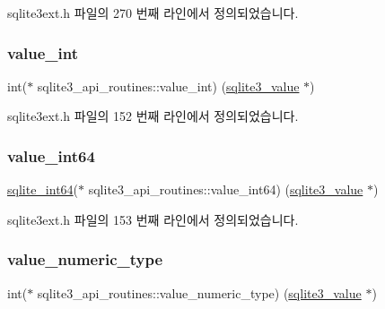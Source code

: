 sqlite3ext.\+h 파일의 270 번째 라인에서 정의되었습니다.

\mbox{\label{structsqlite3__api__routines_aaea71f352f2637f7d43781cd279ece62}} 
\subsubsection{\texorpdfstring{value\+\_\+int}{value\_int}}
{\footnotesize\ttfamily int($\ast$ sqlite3\+\_\+api\+\_\+routines\+::value\+\_\+int) (\hyperlink{sqlite3_8h_ac2fa1ecdb2290d9af6010edbd1cbc83c}{sqlite3\+\_\+value} $\ast$)}



sqlite3ext.\+h 파일의 152 번째 라인에서 정의되었습니다.

\mbox{\label{structsqlite3__api__routines_a27cfd29e44574a9b10f0a7cb3a7c9ada}} 
\subsubsection{\texorpdfstring{value\+\_\+int64}{value\_int64}}
{\footnotesize\ttfamily \hyperlink{sqlite3_8h_a520a95f9080c018b2fade39885bd2e2a}{sqlite\+\_\+int64}($\ast$ sqlite3\+\_\+api\+\_\+routines\+::value\+\_\+int64) (\hyperlink{sqlite3_8h_ac2fa1ecdb2290d9af6010edbd1cbc83c}{sqlite3\+\_\+value} $\ast$)}



sqlite3ext.\+h 파일의 153 번째 라인에서 정의되었습니다.

\mbox{\label{structsqlite3__api__routines_a870e384ce2056e1e608808f8527af223}} 
\subsubsection{\texorpdfstring{value\+\_\+numeric\+\_\+type}{value\_numeric\_type}}
{\footnotesize\ttfamily int($\ast$ sqlite3\+\_\+api\+\_\+routines\+::value\+\_\+numeric\+\_\+type) (\hyperlink{sqlite3_8h_ac2fa1ecdb2290d9af6010edbd1cbc83c}{sqlite3\+\_\+value} $\ast$)}



